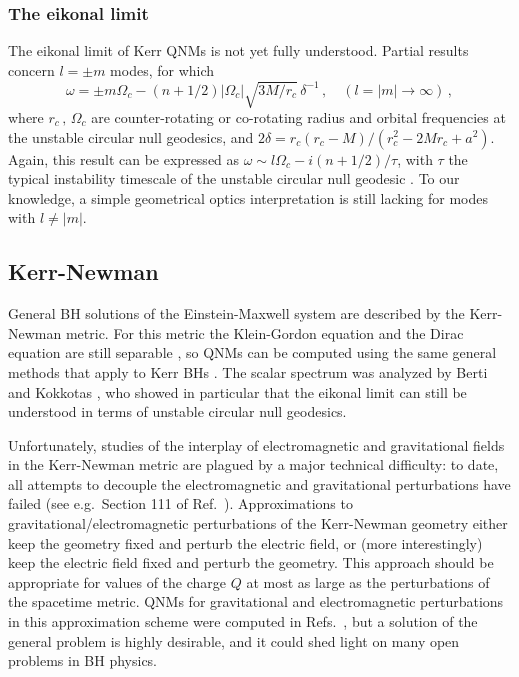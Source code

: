 \documentclass[]{iopart}
\def\be{\begin{equation}}
\def\ee{\end{equation}}
\begin{document}
\subsubsection*{The eikonal limit}

The eikonal limit of Kerr QNMs is not yet fully understood. Partial results
concern $l=\pm m$ modes, for which \cite{mashhoon,Berti:2005ys,Cardoso:2008bp}
%
\be
\omega=\pm m\Omega_{c}-(n+1/2)\left|\Omega_{c}\right
|\sqrt{3M/r_c}\,\delta^{-1}\,,\quad 
(l=|m|\rightarrow \infty)\,,
\ee
%
where $r_{c}\,,\,\Omega_{c}$ are counter-rotating or co-rotating radius and
orbital frequencies at the unstable circular null geodesics, and
$2\delta=r_{c}(r_{c}-M)/(r_c^2-2Mr_c+a^2)$. Again, this result can be
expressed as $\omega\sim l\Omega_c-i(n+1/2)/\tau$, with $\tau$ the typical
instability timescale of the unstable circular null geodesic
\cite{mashhoon,Berti:2005ys,Cardoso:2008bp}. To our knowledge, a simple
geometrical optics interpretation is still lacking for modes with $l\neq |m|$.

\subsection{Kerr-Newman}

General BH solutions of the Einstein-Maxwell system are described by the
Kerr-Newman metric. For this metric the Klein-Gordon equation and the Dirac
equation are still separable \cite{Page:1976jj}, so QNMs can be computed using
the same general methods that apply to Kerr BHs \cite{Jing:2005pk}. The scalar
spectrum was analyzed by Berti and Kokkotas \cite{Berti:2005eb}, who showed in
particular that the eikonal limit can still be understood in terms of unstable
circular null geodesics.

Unfortunately, studies of the interplay of electromagnetic and gravitational
fields in the Kerr-Newman metric are plagued by a major technical difficulty:
to date, all attempts to decouple the electromagnetic and gravitational
perturbations have failed (see e.g.~Section 111 of Ref.~\cite{MTB}).
Approximations to gravitational/electromagnetic perturbations of the
Kerr-Newman geometry either keep the geometry fixed and perturb the electric
field, or (more interestingly) keep the electric field fixed and perturb the
geometry. This approach should be appropriate for values of the charge $Q$ at
most as large as the perturbations of the spacetime metric. QNMs for
gravitational and electromagnetic perturbations in this approximation scheme
were computed in Refs.~\cite{Kokkotas:1993ef,Berti:2005eb}, but a solution of
the general problem is highly desirable, and it could shed light on many open
problems in BH physics.
\end{document}

